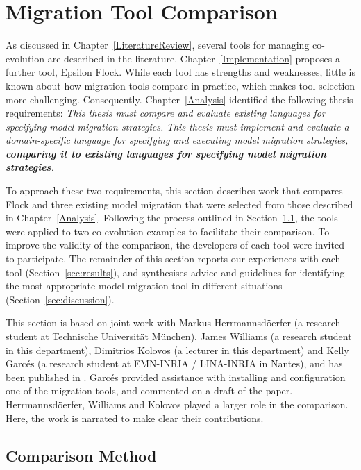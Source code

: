 
\section{Migration Tool Comparison}
\label{sec:collaborative_comparison}

As discussed in Chapter~\ref{LiteratureReview}, several tools for managing co-evolution are described in the literature. Chapter~\ref{Implementation} proposes a further tool, Epsilon Flock. While each tool has strengths and weaknesses, little is known about how migration tools compare in practice, which makes tool selection more challenging. Consequently. Chapter~\ref{Analysis} identified the following thesis requirements: \emph{This thesis must compare and evaluate existing languages for specifying model migration strategies.} \emph{This thesis must implement and evaluate a domain-specific language for specifying and executing model migration strategies, \textbf{comparing it to existing languages for specifying model migration strategies}.}

To approach these two requirements, this section describes work that compares Flock and three existing model migration that were selected from those described in Chapter~\ref{Analysis}. Following the process outlined in Section~\ref{sec:method}, the tools were applied to two co-evolution examples to facilitate their comparison. To improve the validity of the comparison, the developers of each tool were invited to participate. The remainder of this section reports our experiences with each tool (Section~\ref{sec:results}), and synthesises advice and guidelines for identifying the most appropriate model migration tool in different situations (Section~\ref{sec:discussion}).

This section is based on joint work with Markus Herrmannsd\"{o}erfer (a research student at Technische Universit\"at M\"unchen), James Williams (a research student in this department), Dimitrios Kolovos (a lecturer in this department) and Kelly Garc\'{e}s (a research student at EMN-INRIA / LINA-INRIA in Nantes), and has been published in \cite{rose10comparison}. Garc\'{e}s provided assistance with installing and configuration one of the migration tools, and commented on a draft of the paper. Herrmannsd\"{o}erfer, Williams and Kolovos played a larger role in the comparison. Here, the work is narrated to make clear their contributions.

\subsection{Comparison Method}
\label{sec:method}

